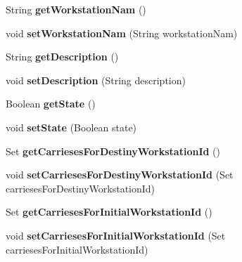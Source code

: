 \begin{DoxyCompactItemize}
\mbox{\label{classentity_1_1_workstation_a8af3245910985e27ce7e8d5d1acd3e2d}} 
String {\bfseries get\+Workstation\+Nam} ()
\item 
\mbox{\label{classentity_1_1_workstation_ae21df43c124cfd95deb4845726473b19}} 
void {\bfseries set\+Workstation\+Nam} (String workstation\+Nam)
\item 
\mbox{\label{classentity_1_1_workstation_ae79cd9019eb03d8526727c98ade26905}} 
String {\bfseries get\+Description} ()
\item 
\mbox{\label{classentity_1_1_workstation_ad164f196f2a925758dac0e9b9e28484b}} 
void {\bfseries set\+Description} (String description)
\item 
\mbox{\label{classentity_1_1_workstation_a49be3c2bef3d42a5596844c603712061}} 
Boolean {\bfseries get\+State} ()
\item 
\mbox{\label{classentity_1_1_workstation_a33d712bc34bd23dcf56492d3dd562635}} 
void {\bfseries set\+State} (Boolean state)
\item 
\mbox{\label{classentity_1_1_workstation_a0da8d108a3195e74a9cd37a48ac80e0d}} 
Set {\bfseries get\+Carrieses\+For\+Destiny\+Workstation\+Id} ()
\item 
\mbox{\label{classentity_1_1_workstation_a9d7abfff67413a398a7927928caa8f35}} 
void {\bfseries set\+Carrieses\+For\+Destiny\+Workstation\+Id} (Set carrieses\+For\+Destiny\+Workstation\+Id)
\item 
\mbox{\label{classentity_1_1_workstation_a9cc802a3b25ea2b483b776ccd0f4a24a}} 
Set {\bfseries get\+Carrieses\+For\+Initial\+Workstation\+Id} ()
\item 
\mbox{\label{classentity_1_1_workstation_a5ac57917431af5a9a85ada5a74f7c64e}} 
void {\bfseries set\+Carrieses\+For\+Initial\+Workstation\+Id} (Set carrieses\+For\+Initial\+Workstation\+Id)
\end{DoxyCompactItemize}


